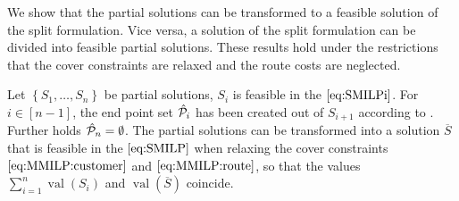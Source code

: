 We show that the partial solutions can be transformed to a feasible solution of the split formulation. Vice versa, a solution of the split formulation can be divided into feasible partial solutions. These results hold under the restrictions that the cover constraints are relaxed and the route costs are neglected.

\begin{theorem}
\label{thm:equivalence_heuristic_SMILP}

Let ${\left\{S_1,\dots,S_n\right\}}$ be partial solutions, \ie $S_i$ is feasible in the $\eqref{eq:SMILPi}$. For ${i\in[n-1]}$, the end point set $\hat{\mathcal{P}}_i$ has been created out of $S_{i+1}$ according to . Further holds ${\hat{\mathcal{P}}_n=\emptyset}$. The partial solutions can be transformed into a solution $\overline{S}$ that is feasible in the $\eqref{eq:SMILP}$ when relaxing the cover constraints $\eqref{eq:MMILP:customer}$ and $\eqref{eq:MMILP:route}$, so that the values ${\sum_{i=1}^n \operatorname{val}\left(S_i\right)}$ and ${\operatorname{val}(\overline{S})}$ coincide.

\end{theorem}

